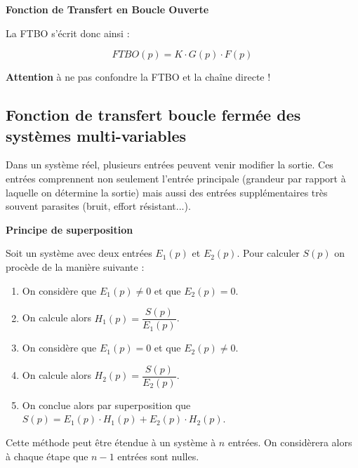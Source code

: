 \documentclass[10pt,fleqn]{article} %
\begin{document}
\begin{resultat}
\textbf{Fonction de Transfert en Boucle Ouverte}

La FTBO s'écrit donc ainsi :

$$
FTBO(p) = K \cdot G(p) \cdot F(p)
$$

\textbf{Attention} à ne pas confondre la FTBO et la chaîne directe !
\end{resultat}

\subsection{Fonction de transfert boucle fermée des systèmes multi-variables}
Dans un système réel, plusieurs entrées peuvent venir modifier la sortie. Ces
entrées comprennent non seulement l'entrée principale (grandeur par rapport à
laquelle on détermine la sortie) mais aussi des entrées
supplémentaires très souvent parasites (bruit, effort résistant...).

\begin{center}
\end{center}


\begin{resultat}
\textbf{Principe de superposition}

Soit un système avec deux entrées $E_1(p)$ et $E_2(p)$. Pour calculer $S(p)$ on procède de la manière suivante : 
\begin{enumerate}
\item On considère que $E_1(p)\neq 0$ et que $E_2(p)=0$.
\item On calcule alors $H_1(p)=\dfrac{S(p)}{E_1(p)}$.
\item On considère que $E_1(p) = 0$ et que $E_2(p) \neq 0$.
\item On calcule alors $H_2(p)=\dfrac{S(p)}{E_2(p)}$.
\item On conclue alors par superposition que $S(p)=E_1(p) \cdot H_1(p) + E_2(p) \cdot H_2(p)$.
\end{enumerate}

Cette méthode peut être étendue à un système à $n$ entrées. On considèrera alors à chaque étape que $n-1$ entrées sont nulles.
\end{resultat}
\end{document}

